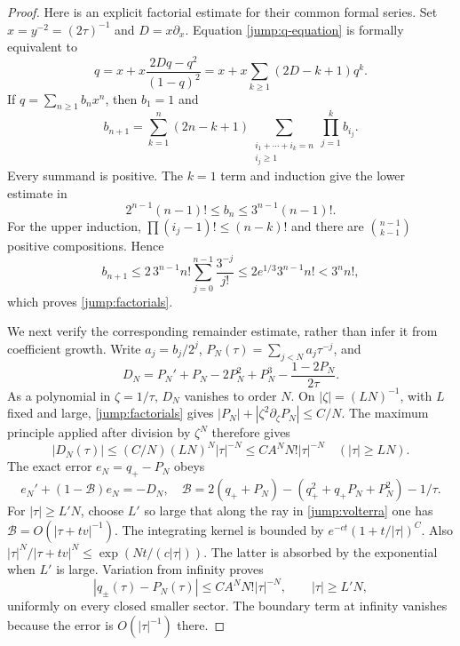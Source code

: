 \begin{proof}
Here is an explicit factorial estimate for their common formal
series.  Set $x=y^{-2}=(2\tau)^{-1}$ and $D=x\partial_x$.
Equation \eqref{jump:q-equation} is formally equivalent to
\begin{equation}\label{jump:positive-recurrence}
 q=x+x\frac{2Dq-q^2}{(1-q)^2}
   =x+x\sum_{k\geq1}(2D-k+1)q^k.
\end{equation}
If $q=\sum_{n\geq1}b_nx^n$, then $b_1=1$ and
\begin{equation}\label{jump:coefficients}
 b_{n+1}=\sum_{k=1}^n(2n-k+1)
       \sum_{\substack{i_1+\cdots+i_k=n\\i_j\geq1}}
                       \prod_{j=1}^k b_{i_j}.
\end{equation}
Every summand is positive.  The $k=1$ term and induction give
the lower estimate in
\begin{equation}\label{jump:factorials}
 2^{n-1}(n-1)!\leq b_n\leq3^{n-1}(n-1)!.
\end{equation}
For the upper induction,
$\prod(i_j-1)!\leq(n-k)!$ and there are
$\binom{n-1}{k-1}$ positive compositions.  Hence
\[
 b_{n+1}\leq
 2\,3^{n-1}n!\sum_{j=0}^{n-1}\frac{3^{-j}}{j!}
 \leq 2e^{1/3}3^{n-1}n!<3^n n!,
\]
which proves \eqref{jump:factorials}.

We next verify the corresponding remainder estimate, rather than
infer it from coefficient growth.  Write $a_j=b_j/2^j$,
$P_N(\tau)=\sum_{j<N}a_j\tau^{-j}$, and
\[
 D_N=P_N'+P_N-2P_N^2+P_N^3-
                         \frac{1-2P_N}{2\tau}.
\]
As a polynomial in $\zeta=1/\tau$, $D_N$ vanishes to order $N$.
On $|\zeta|=(LN)^{-1}$, with $L$ fixed and large,
\eqref{jump:factorials} gives
$|P_N|+|\zeta^2\partial_\zeta P_N|\leq C/N$.
The maximum principle applied after division by $\zeta^N$
therefore gives
\[
 |D_N(\tau)|\leq (C/N)(LN)^N|\tau|^{-N}
                  \leq C A^N N!|\tau|^{-N}
 \quad (|\tau|\geq LN).
\]
The exact error $e_N=q_+-P_N$ obeys
\[
 e_N'+(1-\mathcal B)e_N=-D_N,
 \quad
 \mathcal B=2(q_++P_N)-(q_+^2+q_+P_N+P_N^2)-1/\tau.
\]
For $|\tau|\geq L'N$, choose $L'$ so large that along the
ray in \eqref{jump:volterra} one has
$\mathcal B=O(|\tau+tv|^{-1})$.  The integrating kernel is
bounded by $e^{-ct}(1+t/|\tau|)^C$.
Also
$|\tau|^N/|\tau+tv|^N\leq
 \exp(Nt/(c|\tau|))$.
The latter is absorbed by the exponential when $L'$ is large.
Variation from infinity proves
\begin{equation}\label{jump:factorial-remainder}
 |q_\pm(\tau)-P_N(\tau)|
       \leq C A^N N!|\tau|^{-N},\qquad |\tau|\geq L'N,
\end{equation}
uniformly on every closed smaller sector.  The boundary term at
infinity vanishes because the error is $O(|\tau|^{-1})$ there.


\end{proof}
